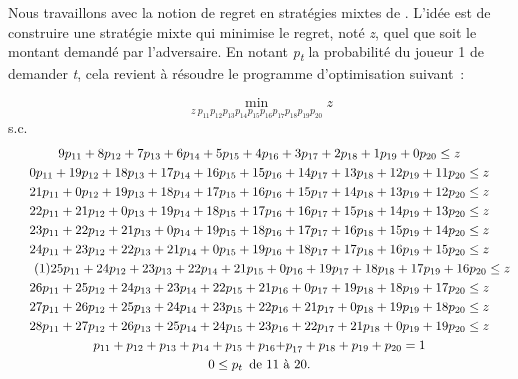 \begin{Article}
\begin{refsection}[UmbhauerFR]
Nous travaillons avec la notion de regret en stratégies mixtes de \textcite{renou2010}. L'idée est de construire une stratégie mixte qui
minimise le regret, noté \emph{z}, quel que soit le montant demandé par
l'adversaire. En notant \emph{p\textsubscript{t}} la probabilité du
joueur 1 de demander \emph{t}, cela revient à résoudre le programme
d'optimisation suivant~:

\newpage
%
\[
\min_{z\ p_{11}p_{12}p_{13}p_{14}p_{15}p_{16}p_{17}p_{18}p_{19}p_{20}}z
\]
s.c.
\begin{multline}
9p_{11} + 8p_{12} + 7p_{13} + 6p_{14} + 5p_{15} + 4p_{16} + 3p_{17} + 2p_{18} + 1p_{19} + 0p_{20} \leq z \\
0p_{11} + 19p_{12} + 18p_{13} + 17p_{14} + 16p_{15} + 15p_{16} + 14p_{17} + 13p_{18}
+ 12p_{19} + 11p_{20} \leq z \\
21p_{11} + 0p_{12} + 19p_{13} + 18p_{14} + 17p_{15} + 16p_{16} + 15p_{17} + 14p_{18}
+ 13p_{19} + 12p_{20} \leq z \\
22p_{11} + 21p_{12} + 0p_{13} + 19p_{14} + 18p_{15} + 17p_{16} + 16p_{17} + 15p_{18}
+ 14p_{19} + 13p_{20} \leq z \\
23p_{11} + 22p_{12} + 21p_{13} + 0p_{14} + 19p_{15} + 18p_{16} + 17p_{17} + 16p_{18}
+ 15p_{19} + 14p_{20} \leq z \\
24p_{11} + 23p_{12} + 22p_{13} + 21p_{14} + 0p_{15} + 19p_{16} + 18p_{17} + 17p_{18}
+ 16p_{19} + 15p_{20} \leq z \\ \tag{1}
25p_{11} + 24p_{12} + 23p_{13} + 22p_{14} + 21p_{15} + 0p_{16} + 19p_{17} + 18p_{18}
+ 17p_{19} + 16p_{20} \leq z \\
26p_{11} + 25p_{12} + 24p_{13} + 23p_{14} + 22p_{15} + 21p_{16} + 0p_{17} + 19p_{18}
+ 18p_{19} + 17p_{20} \leq z \\
27p_{11} + 26p_{12} + 25p_{13} + 24p_{14} + 23p_{15} + 22p_{16} + 21p_{17} + 0p_{18}
+ 19p_{19} + 18p_{20} \leq z \\
28p_{11} + 27p_{12} + 26p_{13} + 25p_{14} + 24p_{15} + 23p_{16} + 22p_{17} + 21p_{18}
+ 0p_{19} + 19p_{20} \leq z \\
p_{11} + p_{12} + p_{13} + p_{14} + p_{15} + p_{16}{+ p}_{17} + p_{18} + p_{19} + p_{20} = 1 \\
0 \leq p_{t}\enskip \text{de 11 à 20.}
\end{multline}


\end{refsection}
\end{Article}
